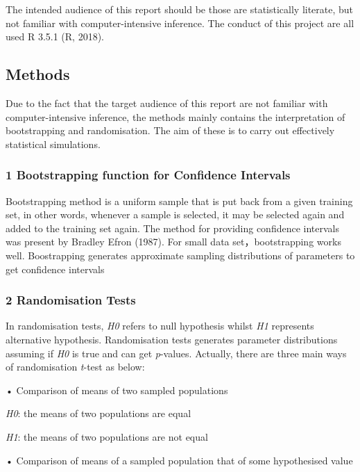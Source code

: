 \documentclass[]{article}
\begin{document}
The intended audience of this report should be those are statistically
literate, but not familiar with computer-intensive inference. The
conduct of this project are all used R 3.5.1 (R, 2018).

\pagebreak

\subsection{Methods}\label{methods}

Due to the fact that the target audience of this report are not familiar
with computer-intensive inference, the methods mainly contains the
interpretation of bootstrapping and randomisation. The aim of these is
to carry out effectively statistical simulations.

\subsubsection{1 Bootstrapping function for Confidence
Intervals}\label{bootstrapping-function-for-confidence-intervals}

Bootstrapping method is a uniform sample that is put back from a given
training set, in other words, whenever a sample is selected, it may be
selected again and added to the training set again. The method for
providing confidence intervals was present by Bradley Efron (1987). For
small data set，bootstrapping works well. Boostrapping generates
approximate sampling distributions of parameters to get confidence
intervals

\subsubsection{2 Randomisation Tests}\label{randomisation-tests}

In randomisation tests, \emph{H0} refers to null hypothesis whilst
\emph{H1} represents alternative hypothesis. Randomisation tests
generates parameter distributions assuming if \emph{H0} is true and can
get \emph{p}-values. Actually, there are three main ways of
randomisation \emph{t}-test as below:

• Comparison of means of two sampled populations

\emph{H0}: the means of two populations are equal

\emph{H1}: the means of two populations are not equal

• Comparison of means of a sampled population that of some hypothesised
value
\end{document}
